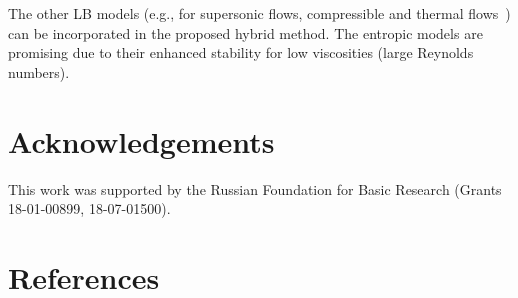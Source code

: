\documentclass[]{elsarticle} %
\begin{document}
The other LB models (e.g., for supersonic flows, compressible and thermal flows~\cite{Chen2010, Frapolli2015, Frapolli2016})
can be incorporated in the proposed hybrid method.
The entropic models are promising due to their enhanced stability for low viscosities (large Reynolds numbers).

\section*{Acknowledgements}

This work was supported by the Russian Foundation for Basic Research (Grants 18-01-00899, 18-07-01500).

\section*{References}


\end{document}
